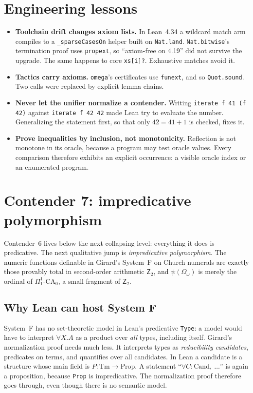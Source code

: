 \documentclass[11pt]{article}
\theoremstyle{definition}
\theoremstyle{remark}
\newcommand{\lean}[1]{\texttt{#1}}
\begin{document}
\section{Engineering lessons}

\begin{itemize}[leftmargin=*]
\item \textbf{Toolchain drift changes axiom lists.} In Lean~4.34 a wildcard match
  arm compiles to a \lean{\_sparseCasesOn} helper built on \lean{Nat.land}.
  \lean{Nat.bitwise}'s termination proof uses \lean{propext}, so ``axiom-free on
  4.19'' did not survive the upgrade. The same happens to core \lean{xs[i]?}.
  Exhaustive matches avoid it.
\item \textbf{Tactics carry axioms.} \lean{omega}'s certificates use
  \lean{funext}, and so \lean{Quot.sound}. Two calls were replaced by explicit
  lemma chains.
\item \textbf{Never let the unifier normalize a contender.} Writing
  \lean{iterate f 41 (f 42)} against \lean{iterate f 42 42} made Lean try to
  evaluate the number. Generalizing the statement first, so that only
  $42=41+1$ is checked, fixes it.
\item \textbf{Prove inequalities by inclusion, not monotonicity.} Reflection is
  not monotone in its oracle, because a program may test oracle values. Every
  comparison therefore exhibits an explicit occurrence: a visible oracle index
  or an enumerated program.
\end{itemize}

\section{Contender 7: impredicative polymorphism}

Contender~6 lives below the next collapsing level: everything it does is
predicative. The next qualitative jump is \emph{impredicative polymorphism}. The
numeric functions definable in Girard's System~F on Church numerals are exactly
those provably total in second-order arithmetic $\mathsf{Z}_2$, and
$\psi(\Omega_\omega)$ is merely the ordinal of $\Pi^1_1$-CA$_0$, a small fragment
of $\mathsf{Z}_2$.

\subsection{Why Lean can host System F}
System~F has no set-theoretic model in Lean's predicative \lean{Type}: a model
would have to interpret $\forall X.A$ as a product over \emph{all} types,
including itself. Girard's normalization proof needs much less. It interprets
types as \emph{reducibility candidates}, predicates on terms, and quantifies
over all candidates. In Lean a candidate is a structure whose main field is
$P:\mathrm{Tm}\to\mathrm{Prop}$. A statement ``$\forall C:\mathrm{Cand},\ \dots$''
is again a proposition, because \lean{Prop} is impredicative. The normalization
proof therefore goes through, even though there is no semantic model.
\end{document}
